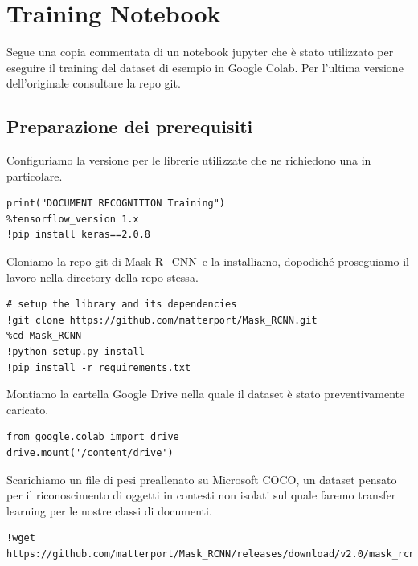 \documentclass[12pt,a4paper]{article}
\newcommand{\mrcnn}{Mask-R\_CNN}
\begin{document}
\pagebreak

\section{Training Notebook} %

Segue una copia commentata di un notebook jupyter che è stato utilizzato
per eseguire il training del dataset di esempio in Google Colab. Per
l'ultima versione dell'originale consultare la repo git.

\subsection{Preparazione dei prerequisiti}

Configuriamo la versione per le librerie utilizzate che ne richiedono
una in particolare.

\begin{verbatim}
print("DOCUMENT RECOGNITION Training")
%tensorflow_version 1.x
!pip install keras==2.0.8
\end{verbatim}

Cloniamo la repo git di \mrcnn\ e la installiamo, dopodiché proseguiamo
il lavoro nella directory della repo stessa.

\begin{verbatim}
# setup the library and its dependencies
!git clone https://github.com/matterport/Mask_RCNN.git
%cd Mask_RCNN
!python setup.py install
!pip install -r requirements.txt
\end{verbatim}

Montiamo la cartella Google Drive nella quale il dataset è stato
preventivamente caricato.

\begin{verbatim}
from google.colab import drive
drive.mount('/content/drive')
\end{verbatim}

Scarichiamo un file di pesi preallenato su Microsoft COCO, un dataset
pensato per il riconoscimento di oggetti in contesti non isolati sul
quale faremo transfer learning per le nostre classi di documenti.

\begin{verbatim}
!wget https://github.com/matterport/Mask_RCNN/releases/download/v2.0/mask_rcnn_coco.h5
\end{verbatim}
\end{document}
